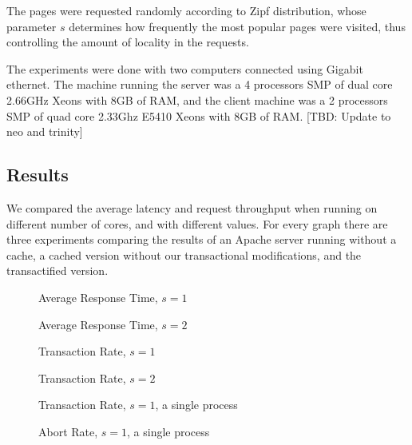 \documentclass[preprint,natbib,11pt]{sigplanconf}
\begin{document}
The pages were requested randomly according to Zipf distribution, whose parameter $s$ determines how frequently the most popular pages were visited, thus controlling the amount of locality in the requests.

The experiments were done with two computers connected using Gigabit ethernet. The machine running the server was a 4 processors SMP of dual core 2.66GHz Xeons with 8GB of RAM, and the client machine was a 2 processors SMP of quad core 2.33Ghz E5410 Xeons with 8GB of RAM. [TBD: Update to neo and trinity]
\subsection{Results}
We compared the average latency and request throughput when running on different number of cores, and with different  values. For every graph there are three experiments comparing the results of an Apache server running without a cache, a cached version without our transactional modifications, and the transactified version. 

\begin{figure}
 \begin{center}
 \end{center}
 \caption{Average Response Time, $s = 1$}
 \label{response-time-1}
\end{figure}
\begin{figure}
 \begin{center}
 \end{center}
 \caption{Average Response Time, $s = 2$}
 \label{response-time-2}
\end{figure}
\begin{figure}
 \begin{center}
 \end{center}
 \caption{Transaction Rate, $s = 1$}
 \label{transaction-rate-1}
\end{figure}
\begin{figure}
 \begin{center}
 \end{center}
 \caption{Transaction Rate, $s = 2$}
 \label{transaction-rate-2}
\end{figure}
\begin{figure}
 \begin{center}
 \end{center}
 \caption{Transaction Rate, $s = 1$, a single process}
 \label{one-process-transaction-rate}
\end{figure}
\begin{figure}
 \begin{center}
 \end{center}
 \caption{Abort Rate, $s = 1$, a single process}
 \label{abort-rate}
\end{figure}
\end{document}
